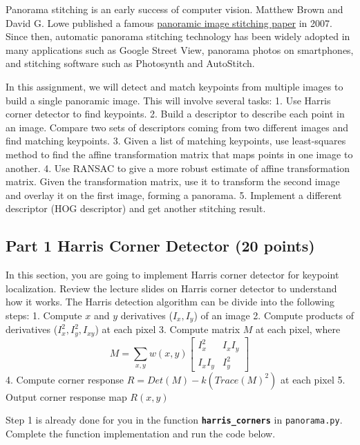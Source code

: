 \documentclass[11pt]{article}
\begin{document}
Panorama stitching is an early success of computer vision. Matthew Brown
and David G. Lowe published a famous
\href{http://matthewalunbrown.com/papers/ijcv2007.pdf}{panoramic image
stitching paper} in 2007. Since then, automatic panorama stitching
technology has been widely adopted in many applications such as Google
Street View, panorama photos on smartphones, and stitching software such
as Photosynth and AutoStitch.

In this assignment, we will detect and match keypoints from multiple
images to build a single panoramic image. This will involve several
tasks: 1. Use Harris corner detector to find keypoints. 2. Build a
descriptor to describe each point in an image. Compare two sets of
descriptors coming from two different images and find matching
keypoints. 3. Given a list of matching keypoints, use least-squares
method to find the affine transformation matrix that maps points in one
image to another. 4. Use RANSAC to give a more robust estimate of affine
transformation matrix. Given the transformation matrix, use it to
transform the second image and overlay it on the first image, forming a
panorama. 5. Implement a different descriptor (HOG descriptor) and get
another stitching result.

    \hypertarget{part-1-harris-corner-detector-20-points}{%
\subsection{Part 1 Harris Corner Detector (20
points)}\label{part-1-harris-corner-detector-20-points}}

In this section, you are going to implement Harris corner detector for
keypoint localization. Review the lecture slides on Harris corner
detector to understand how it works. The Harris detection algorithm can
be divide into the following steps: 1. Compute \(x\) and \(y\)
derivatives (\(I_x, I_y\)) of an image 2. Compute products of
derivatives (\(I_x^2, I_y^2, I_{xy}\)) at each pixel 3. Compute matrix
\(M\) at each pixel, where \[
M = \sum_{x,y} w(x,y)
    \begin{bmatrix}
        I_{x}^2 & I_{x}I_{y} \\
        I_{x}I_{y} & I_{y}^2
    \end{bmatrix}
\] 4. Compute corner response \(R=Det(M)-k(Trace(M)^2)\) at each pixel
5. Output corner response map \(R(x,y)\)

Step 1 is already done for you in the function
\textbf{\texttt{harris\_corners}} in \texttt{panorama.py}. Complete the
function implementation and run the code below.
\end{document}
